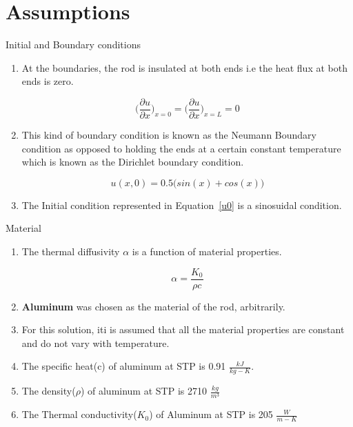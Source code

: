 \documentclass[10pt,compress]{beamer}
\begin{document}
\section{Assumptions}
\begin{frame}{Initial and Boundary conditions}
\begin{enumerate}
\item At the boundaries, the rod is insulated at both ends i.e the heat flux at both ends is zero.
\begin{center}
	\begin{equation} \label{neumannbc}
\bigg( \frac{\partial u}{\partial x} \bigg)_{x=0} = \bigg( \frac{\partial u}{\partial x} \bigg)_{x=L} = 0
\end{equation}
\end{center}
\item This kind of boundary condition is known as the Neumann Boundary condition as opposed to holding the ends at a certain constant temperature which is known as the Dirichlet boundary condition. 
\begin{center}
\begin{equation} \label{u0}
u(x,0)=0.5 \big (  sin(x)+cos(x) \big )
\end{equation}
\end{center}
\item The Initial condition represented in Equation~\ref{u0} is a sinosuidal condition.
\end{enumerate}
\end{frame}

\begin{frame}{Material}
\begin{enumerate}
\item The thermal diffusivity $\alpha$ is a function of material properties.
\begin{center}
	\begin{equation} \label{alpha}
\alpha = \frac{K_{0}}{\rho c}
\end{equation}
\end{center}
\item \textbf{Aluminum} was chosen as the material of the rod, arbitrarily.
\item For this solution, iti is assumed that all the material properties are constant and do not vary with temperature.
\item The specific heat(c) of aluminum at STP is 0.91 $\frac{kJ}{kg-K}$.
\item The density($\rho$) of aluminum at STP is 2710 $\frac{kg}{m^{3}}$
\item The Thermal conductivity($K_{0}$) of Aluminum at STP is 205 $\frac{W}{m-K}$
\end{enumerate}
\end{frame}
\end{document}
